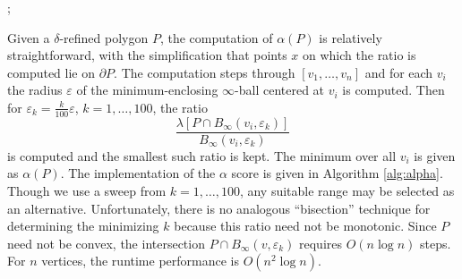 \documentclass[]{jocg}
\newcommand{\norm}[1]{\|#1\|}
\theoremstyle{definition}
\theoremstyle{remark}
\begin{document}

\begin{algorithm}[h]
  \begin{algorithmic}[1]
    ;
    \If {$\norm{\textit{next}(v) - v}_2 > \delta$} 
    \EndIf
    \EndWhile
    \EndProcedure
  \end{algorithmic}
  \caption{%
    The procedure used to refine a given polygon $P$ by a specified $\delta >
    0$. This modifies the existing $P$ to satisfy the regularity condition
    that $\norm{v_{i+1} - v_i} \leq \delta$ for each adjacent vertex pair
    $v_{i+1}, v_i$ on the discretized boundary $\partial P$.  }
  \label{alg:delta}
\end{algorithm}

Given a $\delta$-refined polygon $P$, the computation of $\alpha(P)$ is
relatively straightforward, with the simplification that points $x$ on which the
ratio is computed lie on $\partial P$. The computation steps through $[v_1,
\dots, v_n]$ and for each $v_i$ the radius $\varepsilon$ of the
minimum-enclosing $\infty$-ball centered at $v_i$ is computed. Then for
$\varepsilon_k = \frac{k}{100} \varepsilon$, $k = 1, \dots, 100$, the ratio 
\begin{equation*}
  \frac{\lambda[P \cap B_{\infty}(v_i, \varepsilon_k)]}{B_{\infty}(v_i,
  \varepsilon_k)}
\end{equation*}
is computed and the smallest such ratio is kept. The minimum over all $v_i$ is
given as $\alpha(P)$. The implementation of the $\alpha$ score is given in
Algorithm \ref{alg:alpha}. Though we use a sweep from $k = 1, \dots, 100$, any
suitable range may be selected as an alternative. Unfortunately, there is no
analogous ``bisection'' technique for determining the minimizing $k$ because
this ratio need not be monotonic. Since $P$ need not be convex, the intersection
$P \cap B_{\infty}(v, \varepsilon_k)$ requires $O(n \log n)$ steps. For $n$
vertices, the runtime performance is $O(n^2 \log n)$.

\end{document}
